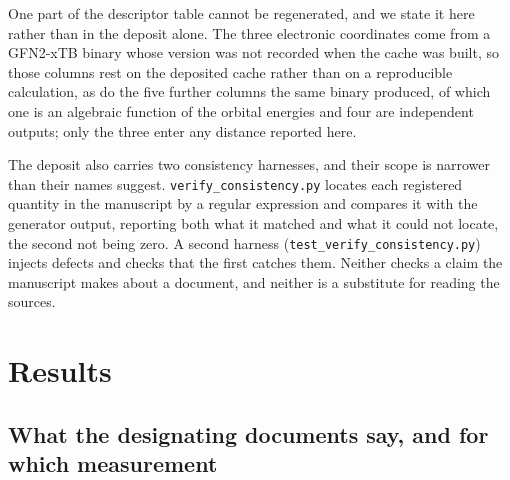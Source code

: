 \documentclass[journal=ancham,manuscript=article,margin=1in]{achemso}
\begin{document}
One part of the descriptor table cannot be regenerated, and we state it here
rather than in the deposit alone. The three electronic coordinates come from a
GFN2-xTB binary whose version was not recorded when the cache was built, so
those columns rest on the deposited cache rather than on a reproducible
calculation, as do the five further columns the same binary produced, of which
one is an algebraic function of the orbital energies and four are independent
outputs; only the three enter any distance reported here.

\begingroup\sloppy
The deposit also carries two consistency harnesses, and their scope is narrower
than their names suggest. \texttt{verify\_consistency.py} locates each
registered quantity in the manuscript by a regular expression and compares it
with the generator output, reporting both what it matched and what it could not
locate, the second not being zero. A second harness
(\texttt{test\_verify\_consistency.py}) injects defects and checks that the
first catches them. Neither checks a claim the
manuscript makes about a document, and neither is a substitute for reading the
sources.
\endgroup

\section{Results}

\subsection{What the designating documents say, and for which measurement}
\label{res:docs}
\end{document}
